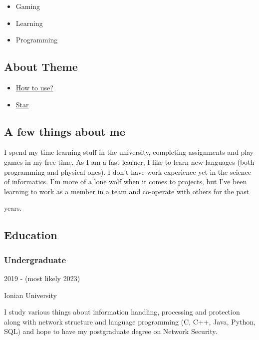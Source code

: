 \documentclass[]{article}
\providecommand{\tightlist}{%
  \setlength{\itemsep}{0pt}\setlength{\parskip}{0pt}}
\begin{document}
\begin{itemize}
\tightlist
\item
  Gaming
\item
  Learning
\item
  Programming
\end{itemize}

\subsection{About Theme}\label{about-theme}

\begin{itemize}
\tightlist
\item
  \href{https://www.youtube.com/watch?v=Jnmj1dXDbNk}{How to use?}
\item
  \href{https://github.com/sharu725/online-cv}{Star}
\end{itemize}

\subsection{\texorpdfstring{{ \emph{} \emph{} } A few things about
me}{    A few things about me}}\label{a-few-things-about-me}

I spend my time learning stuff in the university, completing assignments
and play games in my free time. As I am a fast learner, I like to learn
new languages (both programming and physical ones). I don't have work
experience yet in the science of informatics. I'm more of a lone wolf
when it comes to projects, but I've been learning to work as a member in
a team and co-operate with others for the past

years.

\subsection{\texorpdfstring{{ \emph{} \emph{} }
Education}{    Education}}\label{education}

\subsubsection{Undergraduate}\label{undergraduate}

2019 - (most likely 2023)

Ionian University

I study various things about information handling, processing and
protection along with network structure and language programming (C,
C++, Java, Python, SQL) and hope to have my postgraduate degree on
Network Security.
\end{document}
